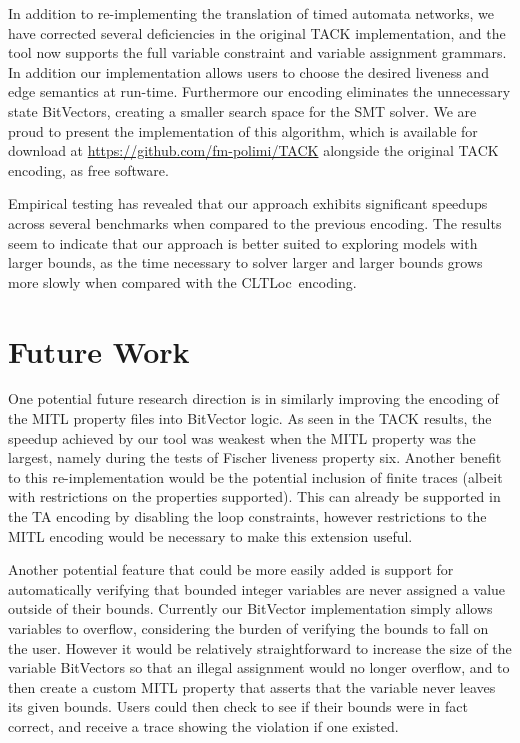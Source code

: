 \documentclass[a4paper,11pt]{report}
\theoremstyle{definition}
\newcommand{\cltloc}{CLTLoc}
\begin{document}
In addition to re-implementing the translation of timed automata networks, we
have corrected several deficiencies in the original TACK implementation, and
the tool now supports the full variable constraint and variable assignment
grammars. In addition our implementation allows users to choose the desired
liveness and edge semantics at run-time. Furthermore our encoding eliminates the
unnecessary state BitVectors, creating a smaller search space for the SMT
solver. We are proud to present the implementation of this algorithm, which is
available for download at \url{https://github.com/fm-polimi/TACK} alongside the
original TACK encoding, as free software.

Empirical testing has revealed that our approach exhibits significant speedups
across several benchmarks when compared to the previous encoding. The results
seem to indicate that our approach is better suited to exploring models with
larger bounds, as the time necessary to solver larger and larger bounds grows
more slowly when compared with the \cltloc\ encoding.

\section{Future Work}

One potential future research direction is in similarly improving the encoding
of the MITL property files into BitVector logic. As seen in the TACK results,
the speedup achieved by our tool was weakest when the MITL property was the
largest, namely during the tests of Fischer liveness property six. Another
benefit to this re-implementation would be the potential inclusion of finite
traces (albeit with restrictions on the properties supported). This can already
be supported in the TA encoding by disabling the loop constraints, however
restrictions to the MITL encoding would be necessary to make this extension useful.

Another potential feature that could be more easily added is support for
automatically verifying that bounded integer variables are never assigned a
value outside of their bounds. Currently our BitVector implementation simply
allows variables to overflow, considering the burden of verifying the bounds to
fall on the user. However it would be relatively straightforward to increase the
size of the variable BitVectors so that an illegal assignment would no longer
overflow, and to then create a custom MITL property that asserts that the
variable never leaves its given bounds. Users could then check to see if their
bounds were in fact correct, and receive a trace showing the violation if one
existed.

\newpage



\end{document}
